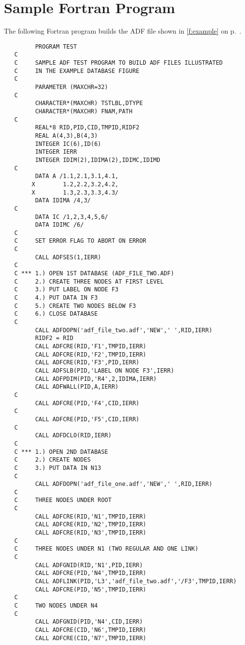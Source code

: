 \section{Sample Fortran Program}
\label{s:sampleFortran}
\thispagestyle{plain}

The following Fortran program builds the ADF file shown in
\autoref{f:example} on p.~\pageref*{f:example}.

\begin{verbatim}
         PROGRAM TEST
   C
   C     SAMPLE ADF TEST PROGRAM TO BUILD ADF FILES ILLUSTRATED
   C     IN THE EXAMPLE DATABASE FIGURE
   C
         PARAMETER (MAXCHR=32)
   C
         CHARACTER*(MAXCHR) TSTLBL,DTYPE
         CHARACTER*(MAXCHR) FNAM,PATH
   C
         REAL*8 RID,PID,CID,TMPID,RIDF2
         REAL A(4,3),B(4,3)
         INTEGER IC(6),ID(6)
         INTEGER IERR
         INTEGER IDIM(2),IDIMA(2),IDIMC,IDIMD
   C
         DATA A /1.1,2.1,3.1,4.1,
        X        1.2,2.2,3.2,4.2,
        X        1.3,2.3,3.3,4.3/
         DATA IDIMA /4,3/
   C
         DATA IC /1,2,3,4,5,6/
         DATA IDIMC /6/
   C
   C     SET ERROR FLAG TO ABORT ON ERROR
   C
         CALL ADFSES(1,IERR)
   C
   C *** 1.) OPEN 1ST DATABASE (ADF_FILE_TWO.ADF)
   C     2.) CREATE THREE NODES AT FIRST LEVEL
   C     3.) PUT LABEL ON NODE F3
   C     4.) PUT DATA IN F3
   C     5.) CREATE TWO NODES BELOW F3
   C     6.) CLOSE DATABASE
   C
         CALL ADFDOPN('adf_file_two.adf','NEW',' ',RID,IERR)
         RIDF2 = RID
         CALL ADFCRE(RID,'F1',TMPID,IERR)
         CALL ADFCRE(RID,'F2',TMPID,IERR)
         CALL ADFCRE(RID,'F3',PID,IERR)
         CALL ADFSLB(PID,'LABEL ON NODE F3',IERR)
         CALL ADFPDIM(PID,'R4',2,IDIMA,IERR)
         CALL ADFWALL(PID,A,IERR)
   C
         CALL ADFCRE(PID,'F4',CID,IERR)
   C
         CALL ADFCRE(PID,'F5',CID,IERR)
   C
         CALL ADFDCLO(RID,IERR)
   C
   C *** 1.) OPEN 2ND DATABASE
   C     2.) CREATE NODES
   C     3.) PUT DATA IN N13
   C
         CALL ADFDOPN('adf_file_one.adf','NEW',' ',RID,IERR)
   C
   C     THREE NODES UNDER ROOT
   C
         CALL ADFCRE(RID,'N1',TMPID,IERR)
         CALL ADFCRE(RID,'N2',TMPID,IERR)
         CALL ADFCRE(RID,'N3',TMPID,IERR)
   C
   C     THREE NODES UNDER N1 (TWO REGULAR AND ONE LINK)
   C
         CALL ADFGNID(RID,'N1',PID,IERR)
         CALL ADFCRE(PID,'N4',TMPID,IERR)
         CALL ADFLINK(PID,'L3','adf_file_two.adf','/F3',TMPID,IERR)
         CALL ADFCRE(PID,'N5',TMPID,IERR)
   C
   C     TWO NODES UNDER N4
   C
         CALL ADFGNID(PID,'N4',CID,IERR)
         CALL ADFCRE(CID,'N6',TMPID,IERR)
         CALL ADFCRE(CID,'N7',TMPID,IERR)

\end{verbatim}
